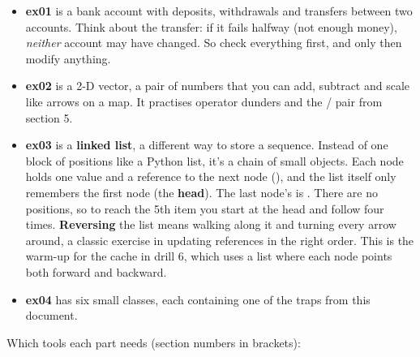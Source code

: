 \documentclass[10pt,a4paper]{article}
\begin{document}
\begin{itemize}
\item \textbf{ex01} is a bank account with deposits, withdrawals and transfers between two accounts. Think about the transfer: if it fails halfway (not enough money), \emph{neither} account may have changed. So check everything first, and only then modify anything.
\item \textbf{ex02} is a 2-D vector, a pair of numbers  that you can add, subtract and scale like arrows on a map. It practises operator dunders and the / pair from section 5.
\item \textbf{ex03} is a \textbf{linked list}, a different way to store a sequence. Instead of one block of positions like a Python list, it’s a chain of small  objects. Each node holds one value and a reference to the next node (), and the list itself only remembers the first node (the \textbf{head}). The last node’s  is . There are no positions, so to reach the 5th item you start at the head and follow  four times. \textbf{Reversing} the list means walking along it and turning every  arrow around, a classic exercise in updating references in the right order. This is the warm-up for the cache in drill 6, which uses a list where each node points both forward and backward.
\item \textbf{ex04} has six small classes, each containing one of the traps from this document.
\end{itemize}
Which tools each part needs (section numbers in brackets):
\end{document}
